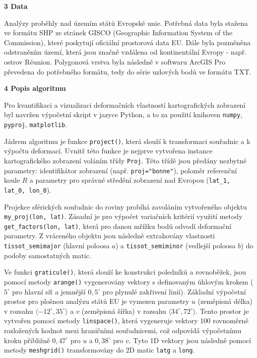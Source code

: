 \documentclass[12pt]{article}
\begin{document}
\newpage
{\large \textbf {3 Data}}

Analýzy proběhly nad územím států Evropské unie. Potřebná data byla stažena ve formátu SHP ze stránek GISCO (Geographic Information System of the Commission), které poskytují oficiální prostorová data EU. Dále byla pozměněna odstraněním území, která jsou značně vzdálena od kontinentální Evropy - např. ostrov Réunion. Polygonová vrstva byla následně v softwaru ArcGIS Pro převedena do potřebného formátu, tedy do série uzlových bodů ve formátu TXT. 

{\large \textbf {4 Popis algoritmu}}

Pro kvantifikaci a vizualizaci deformačních vlastností kartografických zobrazení byl navržen výpočetní skript v jazyce Python, a to za použití knihoven \texttt{numpy}, \texttt{pyproj}, \texttt{matplotlib}.

Jádrem algoritmu je funkce \texttt{project()}, která slouží k transformaci souřadnic a k výpočtu deformací. Uvnitř této funkce je nejprve vytvořena instance kartografického zobrazení voláním třídy \texttt{Proj}. Této třídě jsou předány nezbytné parametry: identifikátor zobrazení (např. \texttt{proj="bonne"}), poloměr referenční koule $R$ a parametry pro správné středění zobrazení nad Evropou (\texttt{lat\_1, lat\_0, lon\_0}).

Projekce sférických souřadnic do roviny probíhá zavoláním vytvořeného objektu \texttt{my\_proj(lon, lat)}. Zásadní je pro výpočet variačních kritérií využití metody \texttt{get\_factors(lon, lat)}, která pro danou mřížku bodů odvodí deformační parametry. Z vráceného objektu jsou následně extrahovány vlastnosti \texttt{tissot\_semimajor} (hlavní poloosa $a$) a \texttt{tissot\_semiminor} (vedlejší poloosa $b$) do podoby samostatných matic.

Ve funkci \texttt{graticule()}, která slouží ke konstrukci poledníků a rovnoběžek, jsou pomocí metody \texttt{arange()} vygenerovány vektory s definovaným úhlovým krokem ($5^\circ$ pro hlavní síť a jemnější $0{,}5^\circ$ pro plynulé zakřivení linií). Základní výpočetní prostor pro plošnou analýzu států EU je vymezen parametry $u$ (zeměpisná délka) v rozsahu $\langle -12^\circ, 35^\circ \rangle$ a $v$ (zeměpisná šířka) v rozsahu $\langle 34^\circ, 72^\circ \rangle$. Tento prostor je vytvořen pomocí metody \texttt{linspace()}, která vygeneruje vektory 100 rovnoměrně rozložených hodnot mezi hraničními souřadnicemi, což odpovídá výpočetnímu kroku přibližně $0{,}47^\circ$ pro $u$ a $0{,}38^\circ$ pro $v$. Tyto 1D vektory jsou následně pomocí metody \texttt{meshgrid()} transformovány do 2D matic \texttt{latg} a \texttt{long}.
\end{document}
